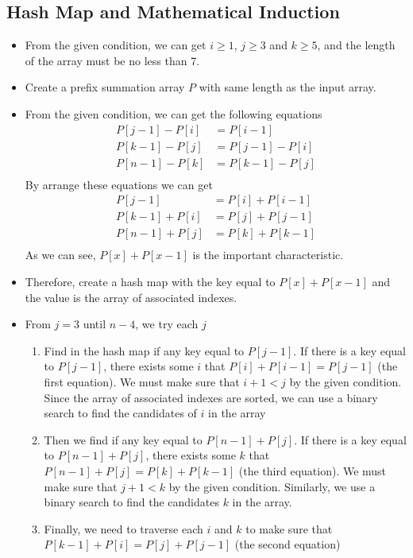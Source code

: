 \subsection{Hash Map and Mathematical Induction}
\begin{itemize}
\item From the given condition, we can get $i\geq 1$, $j \geq 3$ and $k\geq 5$, and the length of the array must be no less than 7.
\item Create a prefix summation array $P$ with same length as the input array.
\item From the given condition, we can get the following equations
\begin{align*}
P[j-1] - P[i] &= P[i-1] \\
P[k-1] - P[j] &= P[j-1] - P[i]\\
P[n-1] - P[k] &= P[k-1] - P[j]\\
\end{align*}
By arrange these equations we can get
\begin{align*}
P[j-1] &=  P[i] + P[i-1] \\
P[k-1] + P[i] &= P[j] + P[j-1]\\
P[n-1] + P[j] &= P[k] + P[k-1]\\
\end{align*}
As we can see, $P[x]+P[x-1]$ is the important characteristic.
\item Therefore, create a hash map with the key equal to $P[x] + P[x-1]$ and the value is the array of associated indexes.
\item From $j=3$ until $n-4$, we try each $j$
 \begin{enumerate}
 \item Find in the hash map if any key equal to $P[j-1]$. If there is a key equal to $P[j-1]$, there exists some $i$ that $P[i] + P[i-1] = P[j-1]$ (the first equation). We must make sure that $i+1 < j$ by the given condition. Since the array of associated indexes are sorted, we can use a binary search to find the candidates of $i$ in the array
 \item Then we find if any key equal to $P[n-1]+P[j]$. If there is a key equal to $P[n-1]+P[j]$, there exists some $k$ that $P[n-1] + P[j] = P[k] + P[k-1]$ (the third equation). We must make sure that $j+1<k$ by the given condition. Similarly, we use a binary search to find the candidates $k$ in the array.
 \item Finally, we need to traverse each $i$ and $k$ to make sure that $P[k-1] + P[i] = P[j] + P[j-1]$ (the second equation)
 \end{enumerate}
\end{itemize}

